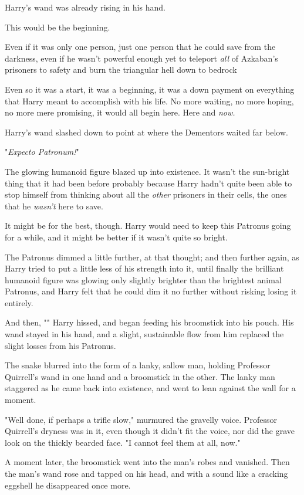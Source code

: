 Harry's wand was already rising in his hand.

This would be the beginning.

Even if it was only one person, just one person that he could save from the
darkness, even if he wasn't powerful enough yet to teleport \emph{all} of
Azkaban's prisoners to safety and burn the triangular hell down to
bedrock{\el}

Even so it was a start, it was a beginning, it was a down payment on everything
that Harry meant to accomplish with his life. No more waiting, no more hoping,
no more mere promising, it would all begin here. Here and \emph{now.}

Harry's wand slashed down to point at where the Dementors waited far below.

"\emph{Expecto Patronum!}"

The glowing humanoid figure blazed up into existence. It wasn't the sun-bright
thing that it had been before{\el} probably because Harry hadn't quite been
able to stop himself from thinking about all the \emph{other} prisoners in
their cells, the ones that he \emph{wasn't} here to save.

It might be for the best, though. Harry would need to keep this Patronus going
for a while, and it might be better if it wasn't quite so bright.

The Patronus dimmed a little further, at that thought; and then further again,
as Harry tried to put a little less of his strength into it, until finally the
brilliant humanoid figure was glowing only slightly brighter than the brightest
animal Patronus, and Harry felt that he could dim it no further without risking
losing it entirely.

And then, "" Harry hissed, and began feeding his
broomstick into his pouch. His wand stayed in his hand, and a slight,
sustainable flow from him replaced the slight losses from his Patronus.

The snake blurred into the form of a lanky, sallow man, holding Professor
Quirrell's wand in one hand and a broomstick in the other. The lanky man
staggered as he came back into existence, and went to lean against the wall for
a moment.

"Well done, if perhaps a trifle slow," murmured the gravelly voice. Professor
Quirrell's dryness was in it, even though it didn't fit the voice, nor did the
grave look on the thickly bearded face. "I cannot feel them at all, now."

A moment later, the broomstick went into the man's robes and vanished. Then the
man's wand rose and tapped on his head, and with a sound like a cracking
eggshell he disappeared once more.

